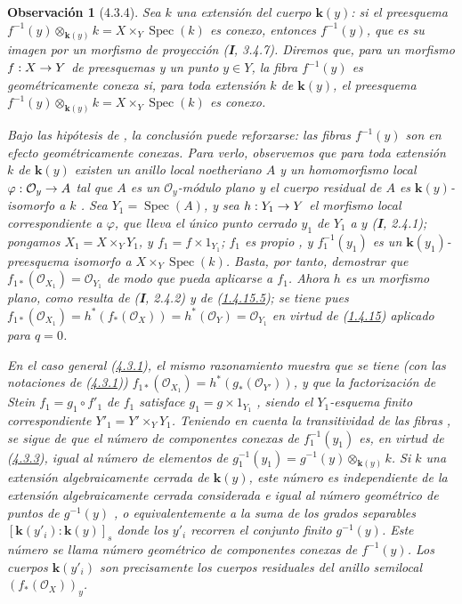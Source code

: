 \documentclass[10pt,oneside,openany]{book}
\theoremstyle{egaenv}\newtheorem*{env}{---}
\theoremstyle{egastatement}
\theoremstyle{egadescription}
\newtheorem*{remark}{Observación}
\newcommand{\oldpage}[2][]{\marginnote{\normalfont\scriptsize\textbf{#1}\,|\,#2}\ignorespaces}
\renewcommand{\to}{\mathchoice{\longrightarrow}{\rightarrow}{\rightarrow}{\rightarrow}}
\begin{document}
\begin{remark}[4.3.4]
\label{III.4.3.4}
\label{III.4.3.4-fr}
Sea $k$ una extensión del cuerpo $\boldsymbol{k}(y)$: si el preesquema $f^{-1}(y)\otimes_{\boldsymbol{k}(y)}k=X\times_Y\operatorname{Spec}(k)$
es conexo, entonces $f^{-1}(y)$, que es su imagen por un morfismo de proyección (\textbf{I}, 3.4.7). Diremos que, para un morfismo $f:X\to Y$ de preesquemas y un punto
$y\in Y$, la fibra $f^{-1}(y)$ es
\emph{geométricamente conexa} si, para \emph{toda} extensión $k$ de
$\boldsymbol{k}(y)$, el preesquema
$f^{-1}(y)\otimes_{\boldsymbol{k}(y)}k=X\times_Y\operatorname{Spec}(k)$ es conexo.

\oldpage[III]{132}

Bajo las hipótesis de , la conclusión puede
reforzarse: las fibras $f^{-1}(y)$ son en efecto \emph{geométricamente conexas}. Para verlo, observemos que para toda extensión $k$ de $\boldsymbol{k}(y)$ existen un anillo
local noetheriano $A$ y un homomorfismo local
$\varphi:\mathcal O_y\to A$
tal que $A$ es un $\mathcal O_y$-módulo plano y el cuerpo residual de
$A$ es $\boldsymbol{k}(y)$-isomorfo a $k$ .
Sea $Y_1=\operatorname{Spec}(A)$, y sea $h:Y_1\to Y$ el morfismo local
correspondiente a $\varphi$, que lleva el único punto cerrado $y_1$ de
$Y_1$ a $y$ (\textbf{I}, 2.4.1); pongamos
$X_1=X\times_YY_1$, y $f_1=f\times1_{Y_1}$; $f_1$ es propio
, y $f_1^{-1}(y_1)$ es un
$\boldsymbol{k}(y_1)$-preesquema isomorfo a $X\times_Y\operatorname{Spec}(k)$. Basta, por
tanto, demostrar que
$f_{1*}(\mathcal O_{X_1})=\mathcal O_{Y_1}$
de modo que  pueda aplicarse a $f_1$. Ahora $h$ es un morfismo \emph{plano},
como resulta de (\textbf{I}, 2.4.2) y de
(\hyperref[III.1.4.15-fr]{1.4.15.5}); se tiene pues
$f_{1*}(\mathcal O_{X_1})
=h^*(f_*(\mathcal O_X))
=h^*(\mathcal O_Y)
=\mathcal O_{Y_1}$
en virtud de (\hyperref[III.1.4.15-fr]{1.4.15}) aplicado para $q=0$.

En el caso general (\hyperref[III.4.3.1-fr]{4.3.1}), el mismo razonamiento
muestra que se tiene (con las notaciones de
(\hyperref[III.4.3.1-fr]{4.3.1}))
$f_{1*}(\mathcal O_{X_1})=h^*(g_*(\mathcal O_{Y'}))$,
y que la factorización de Stein $f_1=g_1\circ f'_1$ de $f_1$
satisface
$g_1=g\times1_{Y_1}$
, siendo el $Y_1$-esquema finito correspondiente
$Y'_1=Y'\times_YY_1$. Teniendo en cuenta la transitividad de las
fibras , se sigue de
 que el número de componentes conexas de
$f_1^{-1}(y_1)$ es, en virtud de (\hyperref[III.4.3.3-fr]{4.3.3}), igual al número de elementos de $g_1^{-1}(y_1)=g^{-1}(y)\otimes_{\boldsymbol{k}(y)}k$.
Si $k$ una extensión \emph{algebraicamente cerrada} de $\boldsymbol{k}(y)$, este número
es independiente de la extensión algebraicamente cerrada considerada e igual al
\emph{número geométrico de puntos de} $g^{-1}(y)$
, o equivalentemente a la
\emph{suma de los grados separables}
$[\boldsymbol{k}(y'_i):\boldsymbol{k}(y)]_s$
donde los $y'_i$ recorren el conjunto finito $g^{-1}(y)$. Este número
se llama \emph{número geométrico de componentes conexas} de
$f^{-1}(y)$. Los cuerpos $\boldsymbol{k}(y'_i)$ son precisamente los cuerpos
residuales del anillo semilocal $(f_*(\mathcal O_X))_y$.
\end{remark}
\end{document}
